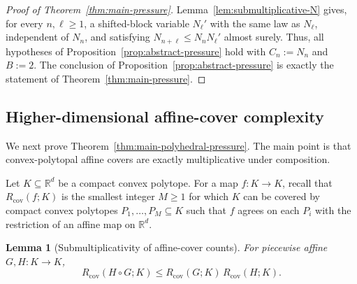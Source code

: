 \documentclass[11pt]{amsart}
\numberwithin{equation}{section}
\theoremstyle{plain}
\newtheorem{lemma}[theorem]{Lemma}
\theoremstyle{definition}
\theoremstyle{remark}
\begin{document}
\begin{proof}[Proof of Theorem~\ref{thm:main-pressure}]
 Lemma~\ref{lem:submultiplicative-N} gives, for every \(n,\ell\ge1\), a shifted-block variable \(N_\ell'\) with the same law as \(N_\ell\), independent of \(N_n\), and satisfying \(N_{n+\ell}\le N_nN_\ell'\) almost surely. Thus, all hypotheses of Proposition~\ref{prop:abstract-pressure} hold with \(C_n:=N_n\) and \(B:=2\). The conclusion of Proposition~\ref{prop:abstract-pressure} is exactly the statement of Theorem~\ref{thm:main-pressure}.
\end{proof}

\subsection{Higher-dimensional affine-cover complexity}

We next prove Theorem~\ref{thm:main-polyhedral-pressure}. The main point is that convex-polytopal affine covers are exactly multiplicative under composition.

Let \(K\subseteq\mathbb R^d\) be a compact convex polytope. For a map \(f:K\to K\), recall that \(R_{\mathrm{cov}}(f;K)\) is the smallest integer \(M\ge1\) for which \(K\) can be covered by compact convex polytopes \(P_1,\dots,P_M\subseteq K\) such that \(f\) agrees on each \(P_i\) with the restriction of an affine map on \(\mathbb R^d\).

\begin{lemma}[Submultiplicativity of affine-cover counts]\label{lem:submultiplicative-cover}
For piecewise affine \(G,H:K\to K\),
\[
R_{\mathrm{cov}}(H\circ G;K)\le R_{\mathrm{cov}}(G;K)\,R_{\mathrm{cov}}(H;K).
\]
\end{lemma}
\end{document}
